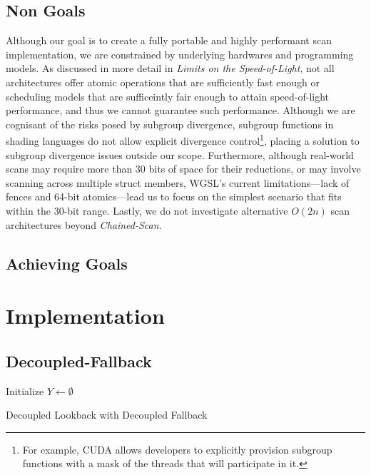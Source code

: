 \documentclass[sigconf]{acmart}
\begin{document}
\subsection{Non Goals}
Although our goal is to create a fully portable and highly performant scan implementation, we are constrained by underlying hardwares and programming models. As discussed in more detail in \emph{Limits on the Speed-of-Light}, not all architectures offer atomic operations that are sufficiently fast enough or scheduling models that are sufficeintly fair enough to attain speed-of-light performance, and thus we cannot guarantee such performance. Although we are cognisant of the risks posed by subgroup divergence, subgroup functions in shading languages do not allow explicit divergence control\footnote{For example, CUDA allows developers to explicitly provision subgroup functions with a mask of the threads that will participate in it.}, placing a solution to subgroup divergence issues outside our scope. Furthermore, although real-world scans may require more than 30 bits of space for their reductions, or may involve scanning across multiple struct members, WGSL’s current limitations---lack of fences and 64-bit atomics---lead us to focus on the simplest scenario that fits within the 30-bit range. Lastly, we do not investigate alternative $O(2n)$ scan architectures beyond \emph{Chained-Scan}.

\subsection{Achieving Goals}

\section{Implementation}

\subsection{Decoupled-Fallback}

\begin{algorithm}[htbp]
  \SetAlgoLined
  Initialize $Y \leftarrow \emptyset$\;
  \;
  \caption{Decoupled Lookback with Decoupled Fallback}
  \label{alg:example}
\end{algorithm}
\end{document}
